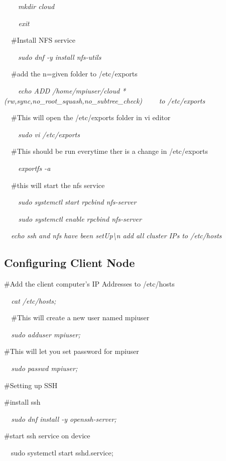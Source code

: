 \documentclass[a4paper]{article}
\begin{document}
\ \ \ \ \textit{mkdir cloud}

{\itshape
\ \ \ \ exit}

\ \ \#Install NFS service 

\ \ \ \ \textit{sudo dnf -y install nfs-utils}

\ \ \#add the n=given folder to /etc/exports

\ \ \ \ \textit{echo {\textquotedbl}ADD /home/mpiuser/cloud *(rw,sync,no\_root\_squash,no\_subtree\_check) \ \ \ \ to
/etc/exports{\textquotedbl}}

\ \ \#This will open the /etc/exports folder in vi editor

\ \ \ \ \textit{sudo vi /etc/exports}

\ \ \#This should be run everytime ther is a change in /etc/exports

\ \ \ \ \textit{exportfs -a}

\ \ \#this will start the nfs service

\ \ \ \ \textit{sudo systemctl start rpcbind nfs-server}

{\itshape
\ \ \ \ sudo systemctl enable rpcbind nfs-server}


\bigskip

\ \ \textit{echo {\textquotedbl}ssh and nfs have been setUp{\textbackslash}n add all cluster IPs to
/etc/hosts{\textquotedbl}}

\subsection[Configuring Client Node]{\textmd{Configuring Client Node}}
\#Add the client computer's IP Addresses to /etc/hosts

{\itshape
\ \ cat /etc/hosts;}

\textit{\ \ }\#This will create a new user named mpiuser 

{\itshape
\ \ sudo adduser mpiuser;}

\#This will let you set password for mpiuser

{\itshape
\ \ sudo passwd mpiuser;}


\bigskip


\bigskip


\bigskip

\#Setting up SSH

\#install ssh

{\itshape
\ \ sudo dnf install -y openssh-server;}

\#start ssh service on device

\ \ sudo systemctl start sshd.service;
\end{document}
